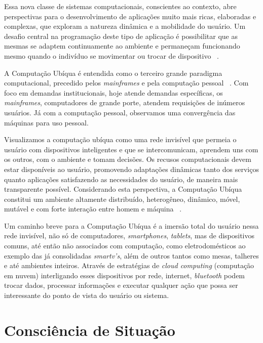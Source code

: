 \documentclass[12pt,a4paper,compsoc]{IEEEtran}
\begin{document}
  Essa nova classe de sistemas computacionais, conscientes ao contexto, abre perspectivas para o
  desenvolvimento de aplicações muito mais ricas, elaboradas e complexas, que exploram a natureza
  dinâmica e a mobilidade do usuário. Um desafio central na programação deste tipo de aplicação é
  possibilitar que as mesmas se adaptem continuamente ao ambiente e permaneçam funcionando mesmo
  quando o indivíduo se movimentar ou trocar de dispositivo ~\cite{GrimmB03, Cac08}.
  
  A Computação Ubíqua é entendida como o terceiro grande paradigma computacional, precedido pelos
  \textit{mainframes} e pela computação pessoal ~\cite{weiser1997}. Com foco em demandas 
  institucionais, hoje atende demandas específicas, os \textit{mainframes}, computadores de grande
  porte, atendem requisições de inúmeros usuários. Já com a computação pessoal, observamos uma
  convergência das máquinas para uso pessoal.
  
  Visualizamos a computação ubíqua como uma rede invisível que permeia o usuário com dispositivos
  inteligentes e que se intercomunicam, aprendem uns com os outros, com o ambiente e tomam
  decisões. Os recusos computacionais devem estar disponíveis ao usuário, promovendo adaptações
  dinâmicas tanto dos serviços quanto aplicações satisfazendo as necessidades do usuário, de 
  maneira mais transparente possível. Considerando esta perspectiva, a Computação Ubíqua constitui
  um ambiente altamente distribuído, heterogêneo, dinâmico, móvel, mutável e com forte interação
  entre homem e máquina ~\cite{Augustin03}.
  
  Um caminho breve para a Computação Ubíqua é a imersão total do usuário nessa rede invisível, não
  só de computadores, \textit{smartphones}, \textit{tablets}, mas de dispositivos comuns, até então
  não associados com computação, como eletrodomésticos ao exemplo das já consolidadas 
  \textit{smartv's}, além de outros tantos como mesas, talheres e até ambientes inteiros. Através
  de estratégias de \textit{cloud computing} (computação em nuvem) interligando esses dispositivos
  por rede, internet, \textit{bluetooth} podem trocar dados, processar informações e executar
  qualquer ação que possa ser interessante do ponto de vista do usuário ou sistema.
  

\section{Consciência de Situação}
\end{document}

